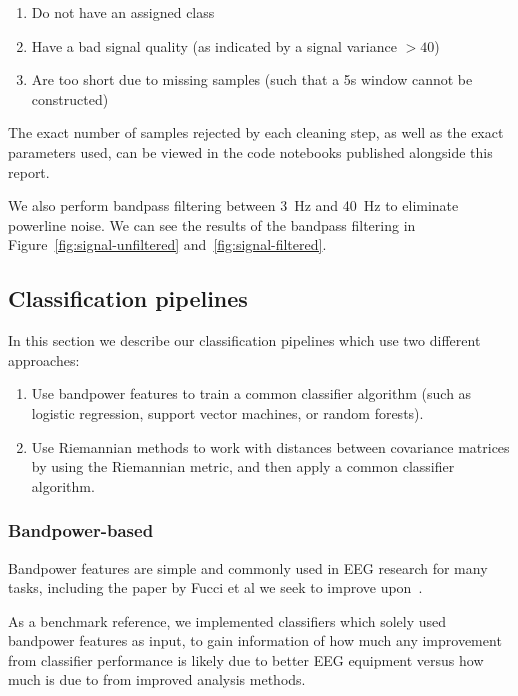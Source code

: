         \begin{enumerate}
            \item Do not have an assigned class
            \item Have a bad signal quality (as indicated by a signal variance $>40$)
            \item Are too short due to missing samples (such that a 5s window cannot be constructed)
        \end{enumerate}

        The exact number of samples rejected by each cleaning step, as well as the exact parameters used, can be viewed in the code notebooks published alongside this report.

        We also perform bandpass filtering between \SI{3}{\hertz} and \SI{40}{\hertz} to eliminate powerline noise. We can see the results of the bandpass filtering in Figure~\ref{fig:signal-unfiltered} and~\ref{fig:signal-filtered}.

    \subsection{Classification pipelines}

        In this section we describe our classification pipelines which use two different approaches:

        \begin{enumerate}
            \item Use bandpower features to train a common classifier algorithm (such as logistic regression, support vector machines, or random forests).
            \item Use Riemannian methods to work with distances between covariance matrices by using the Riemannian metric, and then apply a common classifier algorithm.
        \end{enumerate}

        \subsubsection{Bandpower-based}

            Bandpower features are simple and commonly used in EEG research for many tasks, including the paper by Fucci et al we seek to improve upon~\cite{fucci_replication_2019}. 

            As a benchmark reference, we implemented classifiers which solely used bandpower features as input, to gain information of how much any improvement from classifier performance is likely due to better EEG equipment versus how much is due to from improved analysis methods.

